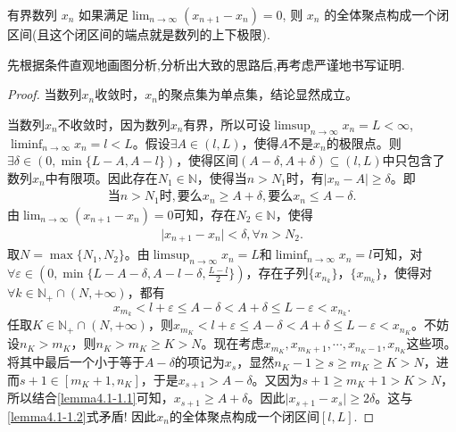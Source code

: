 \documentclass[../../main.tex]{subfiles}
\begin{document}
\begin{lemma}\label{lemma:有界数列差分极限为0则其闭包一定是闭区间}
有界数列 \( x_n \) 如果满足$\lim_{n \to \infty} (x_{n+1} - x_n) = 0$,
则 \( x_n \) 的全体聚点构成一个闭区间(且这个闭区间的端点就是数列的上下极限).
\end{lemma}
\begin{note}
先根据条件直观地画图分析,分析出大致的思路后,再考虑严谨地书写证明.
\end{note}
\begin{proof}
当数列\(x_n\)收敛时，\(x_n\)的聚点集为单点集，结论显然成立。

当数列\(x_n\)不收敛时，因为数列\(x_n\)有界，所以可设\(\limsup_{n\rightarrow \infty}x_n = L<\infty\),\(\liminf_{n\rightarrow \infty}x_n = l<L\)。假设\(\exists A\in (l,L)\)，使得\(A\)不是\(x_n\)的极限点。则\(\exists \delta \in \left( 0,\min \{ L - A,A - l \} \right)\)，使得区间\((A - \delta,A + \delta)\subseteq (l,L)\)中只包含了数列\(x_n\)中有限项。因此存在\(N_1\in \mathbb{N}\)，使得当\(n > N_1\)时，有\(\vert x_n - A\vert\geqslant \delta\)。即
\begin{align}
\text{当}n>N_1\text{时},\text{要么}x_n\geqslant A+\delta ,\text{要么}x_n\leqslant A-\delta .\label{lemma4.1-1.1}
\end{align}
由\(\lim_{n\rightarrow \infty}(x_{n + 1} - x_n) = 0\)可知，存在\(N_2\in \mathbb{N}\)，使得
\begin{align}
\vert x_{n + 1} - x_n\vert<\delta,\forall n > N_2. \label{lemma4.1-1.2}
\end{align}
取\(N = \max \{ N_1,N_2 \}\)。由\(\limsup_{n\rightarrow \infty}x_n = L\)和\(\liminf_{n\rightarrow \infty}x_n = l\)可知，对\(\forall \varepsilon \in \left( 0,\min \{ L - A - \delta,A - l - \delta,\frac{L - l}{2} \} \right)\)，存在子列\(\{ x_{n_k} \}\)，\(\{ x_{m_k} \}\)，使得对\(\forall k\in \mathbb{N}_+\cap (N,+\infty)\)，都有
\[
x_{m_k}<l + \varepsilon \leqslant A - \delta <A + \delta \leqslant L - \varepsilon <x_{n_k}.
\]
任取\(K\in \mathbb{N}_+\cap (N,+\infty)\)，则\(x_{m_K}<l + \varepsilon \leqslant A - \delta <A + \delta \leqslant L - \varepsilon <x_{n_K}\)。不妨设\(n_K>m_K\)，则\(n_K>m_K\geqslant K>N\)。现在考虑\(x_{m_K},x_{m_K + 1},\cdots,x_{n_K - 1},x_{n_K}\)这些项。将其中最后一个小于等于\(A - \delta\)的项记为\(x_s\)，显然\(n_K - 1\geqslant s\geqslant m_K\geqslant K>N\)，进而\(s + 1\in [m_K + 1,n_K]\)，于是\(x_{s + 1}>A - \delta\)。又因为\(s + 1\geqslant m_K + 1>K>N\)，所以结合\eqref{lemma4.1-1.1}可知，\(x_{s + 1}\geqslant A + \delta\)。因此\(\vert x_{s + 1} - x_s\vert\geqslant 2\delta\)。这与\eqref{lemma4.1-1.2}式矛盾! 因此\(x_n\)的全体聚点构成一个闭区间$[l,L]$.
\end{proof}
\end{document}

